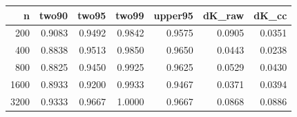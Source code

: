 \begin{tabular}{rrrrrrr}
\toprule
n & two90 & two95 & two99 & upper95 & dK_raw & dK_cc \\
\midrule
200 & 0.9083 & 0.9492 & 0.9842 & 0.9575 & 0.0905 & 0.0351 \\
400 & 0.8838 & 0.9513 & 0.9850 & 0.9650 & 0.0443 & 0.0238 \\
800 & 0.8825 & 0.9450 & 0.9925 & 0.9625 & 0.0529 & 0.0430 \\
1600 & 0.8933 & 0.9200 & 0.9933 & 0.9467 & 0.0371 & 0.0394 \\
3200 & 0.9333 & 0.9667 & 1.0000 & 0.9667 & 0.0868 & 0.0886 \\
\bottomrule
\end{tabular}
